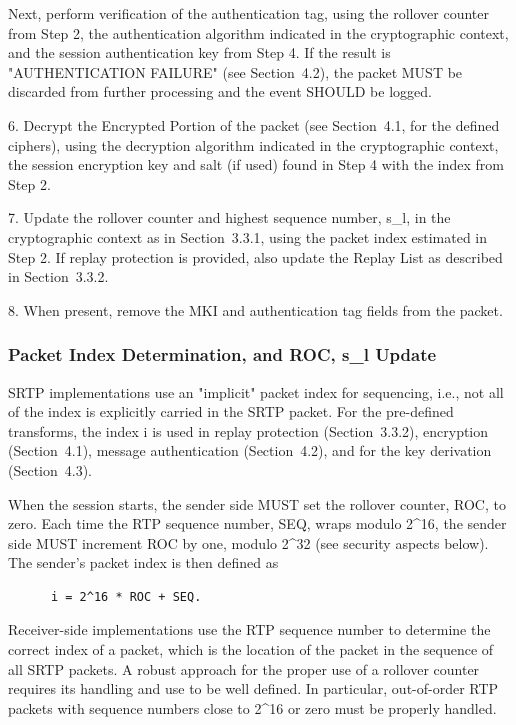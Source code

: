 \documentclass{article}
\begin{document}
Next, perform verification of the authentication tag, using the rollover counter from Step 2, the authentication algorithm indicated in the cryptographic context, and the session authentication key from Step 4.  If the result is "AUTHENTICATION FAILURE" (see Section~4.2), the packet MUST be discarded from further processing and the event SHOULD be logged.

6. Decrypt the Encrypted Portion of the packet (see Section~4.1, for the defined ciphers), using the decryption algorithm indicated in the cryptographic context, the session encryption key and salt (if used) found in Step 4 with the index from Step 2.

7. Update the rollover counter and highest sequence number, s\_l, in the cryptographic context as in Section~3.3.1, using the packet index estimated in Step 2.  If replay protection is provided, also update the Replay List as described in Section~3.3.2.

8. When present, remove the MKI and authentication tag fields from the packet.

\subsubsection{Packet Index Determination, and ROC, s\_l Update}

SRTP implementations use an "implicit" packet index for sequencing, i.e., not all of the index is explicitly carried in the SRTP packet. For the pre-defined transforms, the index i is used in replay protection (Section~3.3.2), encryption (Section~4.1), message authentication (Section~4.2), and for the key derivation (Section~4.3).

When the session starts, the sender side MUST set the rollover counter, ROC, to zero.  Each time the RTP sequence number, SEQ, wraps modulo 2\textasciicircum{}16, the sender side MUST increment ROC by one, modulo 2\textasciicircum{}32 (see security aspects below).  The sender's packet index is then defined as

\begin{verbatim}
      i = 2^16 * ROC + SEQ.
\end{verbatim}

Receiver-side implementations use the RTP sequence number to determine the correct index of a packet, which is the location of the packet in the sequence of all SRTP packets.  A robust approach for the proper use of a rollover counter requires its handling and use to be well defined.  In particular, out-of-order RTP packets with sequence numbers close to 2\textasciicircum{}16 or zero must be properly handled.
\end{document}
